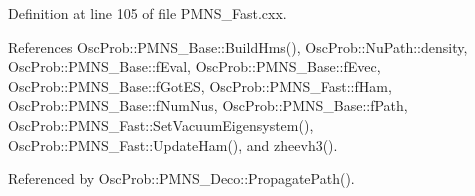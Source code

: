 Definition at line 105 of file P\+M\+N\+S\+\_\+\+Fast.\+cxx.



References Osc\+Prob\+::\+P\+M\+N\+S\+\_\+\+Base\+::\+Build\+Hms(), Osc\+Prob\+::\+Nu\+Path\+::density, Osc\+Prob\+::\+P\+M\+N\+S\+\_\+\+Base\+::f\+Eval, Osc\+Prob\+::\+P\+M\+N\+S\+\_\+\+Base\+::f\+Evec, Osc\+Prob\+::\+P\+M\+N\+S\+\_\+\+Base\+::f\+Got\+ES, Osc\+Prob\+::\+P\+M\+N\+S\+\_\+\+Fast\+::f\+Ham, Osc\+Prob\+::\+P\+M\+N\+S\+\_\+\+Base\+::f\+Num\+Nus, Osc\+Prob\+::\+P\+M\+N\+S\+\_\+\+Base\+::f\+Path, Osc\+Prob\+::\+P\+M\+N\+S\+\_\+\+Fast\+::\+Set\+Vacuum\+Eigensystem(), Osc\+Prob\+::\+P\+M\+N\+S\+\_\+\+Fast\+::\+Update\+Ham(), and zheevh3().



Referenced by Osc\+Prob\+::\+P\+M\+N\+S\+\_\+\+Deco\+::\+Propagate\+Path().


